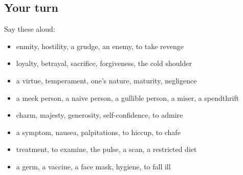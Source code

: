 \subsection*{Your turn}
Say these aloud:

\begin{itemize}
\raggedright
  \item enmity, hostility, a grudge, an enemy, to take revenge
  \item loyalty, betrayal, sacrifice, forgiveness, the cold shoulder
  \item a virtue, temperament, one’s nature, maturity, negligence
  \item a meek person, a naive person, a gullible person, a miser, a spendthrift
  \item charm, majesty, generosity, self-confidence, to admire
  \item a symptom, nausea, palpitations, to hiccup, to chafe
  \item treatment, to examine, the pulse, a scan, a restricted diet
  \item a germ, a vaccine, a face mask, hygiene, to fall ill
\end{itemize}

